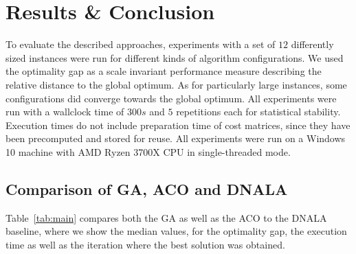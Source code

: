 \documentclass[12pt]{article}
\begin{document}
\section{Results \& Conclusion}
To evaluate the described approaches, experiments with a set of $12$ differently sized instances were run for different kinds of algorithm configurations. 
We used the optimality gap as a scale invariant performance measure describing the relative distance to the global optimum. 
As for particularly large instances, some configurations did converge towards the global optimum.
All experiments were run with a wallclock time of $300 s$ and $5$ repetitions each for statistical stability. Execution times do not include preparation time of cost matrices, since they have been precomputed and stored for reuse. All experiments were run on a Windows 10 machine with AMD Ryzen 3700X CPU in single-threaded mode. 

\subsection{Comparison of GA, ACO and DNALA}

Table~\ref{tab:main} compares both the GA as well as the ACO to the DNALA baseline, where we show the median values, for the optimality gap, the execution time as well as the iteration where the best solution was obtained. 
\end{document}
